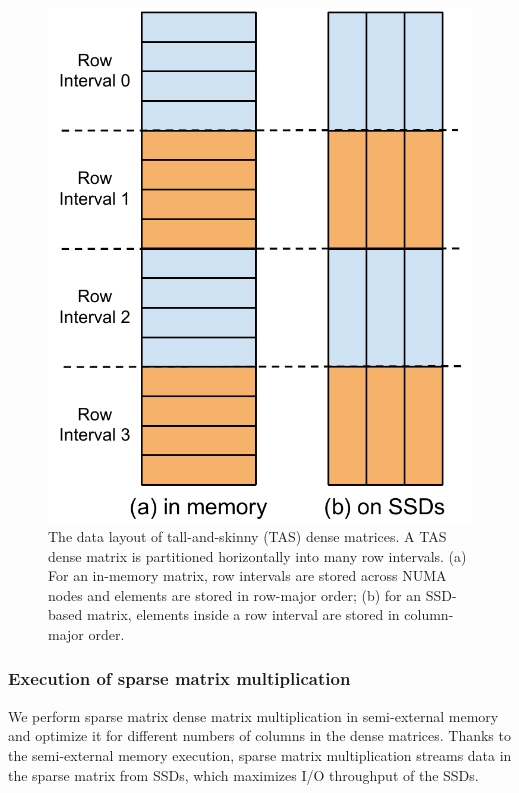 \begin{figure}
\centering
\includegraphics[scale=0.4]{./dense_matrix.pdf}
\caption{The data layout of tall-and-skinny (TAS) dense matrices. A TAS
dense matrix is partitioned horizontally into many row intervals.
(a) For an in-memory matrix, row intervals are stored across NUMA nodes and
elements are stored in row-major order; (b) for an SSD-based matrix, elements
inside a row interval are stored in column-major order.}
\label{dense_mat}
\end{figure}

\subsubsection{Execution of sparse matrix multiplication} \label{sec:exec}
We perform sparse matrix dense matrix multiplication in semi-external memory
and optimize it for different numbers of columns in the dense matrices.
Thanks to the semi-external memory execution, sparse matrix multiplication
streams data in the sparse matrix from SSDs, which maximizes I/O throughput
of the SSDs.

